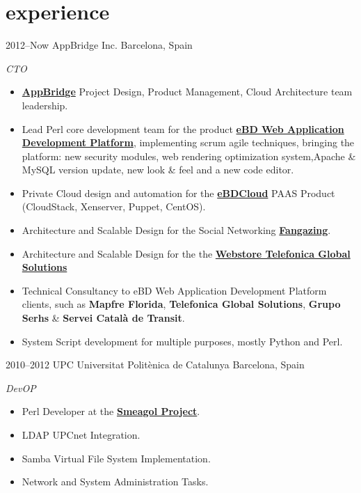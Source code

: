 \documentclass[]{friggeri-cv} %
\begin{document}
\section{experience}
\begin{entrylist}

\entry
{2012--Now}
{AppBridge Inc.}
{Barcelona, Spain}
{\emph{CTO} \\
\begin{itemize}
\item \href{http://www.appbridge.com}{\textbf{AppBridge}} Project Design, Product Management, Cloud Architecture team leadership.
\item Lead Perl core development team for the product \href{http://www.ebdsoft.com}{\textbf{eBD Web Application Development Platform}}, implementing scrum agile techniques, bringing the platform: new security modules, web rendering optimization system,Apache \& MySQL version update, new look \& feel and a new code editor.
\item Private Cloud design and automation for the  \href{http://www.ebdcloud.com}{\textbf{eBDCloud}} PAAS Product (CloudStack, Xenserver, Puppet, CentOS).
\item Architecture and Scalable Design for the Social Networking \href{http://www.fangazing.com/berto}{\textbf{Fangazing}}.
\item Architecture and Scalable Design for the the \href{https://webstore.telefonicaglobalsolutions.com}{\textbf{Webstore Telefonica Global Solutions}}
\item Technical Consultancy to eBD Web Application Development Platform clients, such as \textbf{Mapfre Florida}, \textbf{Telefonica Global Solutions}, \textbf{Grupo Serhs} \& \textbf{Servei Català de Transit}.
\item System Script development for multiple purposes, mostly Python and Perl.   
\end{itemize}}
\pagebreak
\entry
{2010--2012}
{UPC Universitat Politènica de Catalunya}
{Barcelona, Spain}
{\emph{DevOP} \\
\begin{itemize}
\item Perl Developer at the \href{https://github.com/smeagol-upc/smeagol-perl}{\textbf{Smeagol Project}}.
\item LDAP UPCnet Integration.
\item Samba Virtual File System Implementation.
\item Network and System Administration Tasks.

\end{itemize}}
\end{entrylist}
\end{document}
